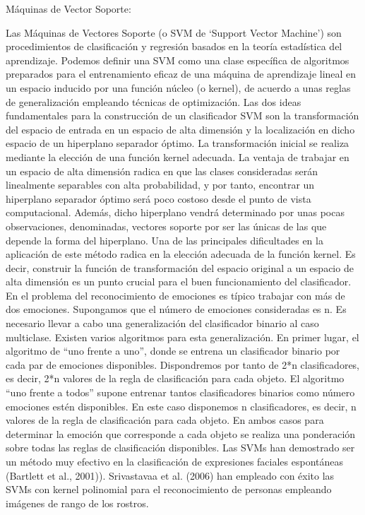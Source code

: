 \begin{enumerate}
{\bf \item Máquinas de Vector Soporte:} \vskip 0.1cm
Las Máquinas de Vectores Soporte (o SVM de ‘Support Vector Machine’) son procedimientos de clasificación y regresión basados en la teoría estadística del aprendizaje. Podemos definir una SVM como una clase específica de algoritmos preparados para el entrenamiento eficaz de una máquina de aprendizaje lineal en un espacio inducido por una función núcleo (o kernel), de acuerdo a unas reglas de generalización empleando técnicas de optimización. Las dos ideas fundamentales para la construcción de un clasificador SVM son la transformación del espacio de entrada en un espacio de alta dimensión y la localización en dicho espacio de un hiperplano separador óptimo. La transformación inicial se realiza mediante la elección de una función kernel adecuada. La ventaja de trabajar en un espacio de alta dimensión radica en que las clases consideradas serán linealmente separables con alta probabilidad, y por tanto, encontrar un hiperplano separador óptimo será poco costoso desde el punto de vista computacional. Además, dicho hiperplano vendrá determinado por unas pocas observaciones, denominadas, vectores soporte por ser las únicas de las que depende la forma del hiperplano. Una de las principales dificultades en la aplicación de este método radica en la elección adecuada de la función kernel. Es decir, construir la función de transformación del espacio original a un espacio de alta dimensión es un punto crucial para el buen funcionamiento del clasificador.
\vskip 0.1cm
En el problema del reconocimiento de emociones es típico trabajar con más de dos emociones. Supongamos que el número de emociones consideradas es n. Es necesario llevar a cabo una generalización del clasificador binario al caso multiclase.
\vskip 0.1cm
Existen varios algoritmos para esta generalización. En primer lugar, el algoritmo de “uno frente a uno”, donde se entrena un clasificador binario por cada par de emociones disponibles. Dispondremos por tanto de 2*n clasificadores, es decir, 2*n valores de la regla de clasificación para cada objeto. El algoritmo “uno frente a todos” supone entrenar tantos clasificadores binarios como número emociones estén disponibles. En este caso disponemos n clasificadores, es decir, n valores de la regla de clasificación para cada objeto. En ambos casos para determinar la emoción que corresponde a cada objeto se realiza una ponderación sobre todas las reglas de clasificación disponibles.
\vskip 0.1cm
Las SVMs han demostrado ser un método muy efectivo en la clasificación de expresiones faciales espontáneas (Bartlett et al., 2001)). Srivastavaa et al. (2006) han empleado con éxito las SVMs con kernel polinomial para el reconocimiento de personas empleando imágenes de rango de los rostros.


\end{enumerate}
